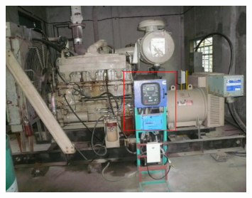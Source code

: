 \documentclass[a4paper,12pt]{article}
\begin{document}
                                                                                                                                                                                                                                                                                                                                                                                                                                                                                                                                                \begin{figure}
                                                                                                                                                                                                                                                                                                                                                                                                                                                                                                                                                                      \begin{center}
                                                                                                                                                                                                                                                                                                                                                                                                                                                                                                                                                                                                \includegraphics[width=0.8\textwidth]{GeneratorMeter.pdf}

\end{center}
\end{figure}
\end{document}

